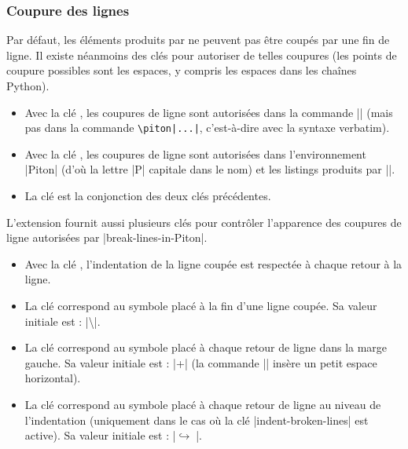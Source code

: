 \documentclass[dvipsnames,svgnames]{article}
\begin{document}
\subsubsection{Coupure des lignes}

\label{line-breaks}

Par défaut, les éléments produits par  ne peuvent pas être coupés par une fin de ligne. Il existe
néanmoins des clés pour autoriser de telles coupures (les points de coupure possibles sont les espaces, y compris
les espaces dans les chaînes Python).
\begin{itemize}
\item {} Avec la clé , les coupures de ligne sont autorisées dans la commande
|| (mais pas dans la commande \verb+\piton|...|+, c'est-à-dire avec la syntaxe verbatim). 

\item {} Avec la clé , les coupures de ligne sont autorisées dans l'environnement
|{Piton}| (d'où la lettre |P| capitale dans le nom) et les listings produits par |\PitonInputFile|.

\item {} La clé  est la conjonction des deux clés précédentes.
\end{itemize}

\medskip
L'extension  fournit aussi plusieurs clés pour contrôler l'apparence des coupures de ligne autorisées par |break-lines-in-Piton|.

\begin{itemize}
\item {} Avec la clé , l'indentation de la ligne coupée est respectée à chaque retour
à la ligne. 

\item {} La clé  correspond au symbole placé à la fin d'une ligne coupée. Sa valeur initiale est : 
|\hspace*{0.5em}\textbackslash|.

\item {} La clé  correspond au symbole placé à chaque retour de ligne dans la marge
gauche. Sa valeur initiale est : |+\;| (la commande |\;| insère un petit espace horizontal). 

\item {} La clé  correspond au symbole placé à chaque retour de ligne
au niveau de l'indentation (uniquement dans le cas où la clé |indent-broken-lines| est active). Sa valeur initiale
est : |$\hookrightarrow\;$|.
\end{itemize}
\end{document}
